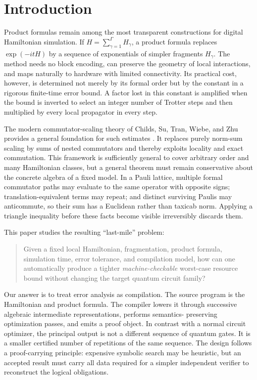 \section{Introduction}
\label{sec:introduction}

Product formulas remain among the most transparent constructions for digital
Hamiltonian simulation.  If $H=\sum_{\gamma=1}^{\Gamma}H_\gamma$, a product
formula replaces $\exp(-itH)$ by a sequence of exponentials of simpler
fragments $H_\gamma$.  The method needs no block encoding, can preserve the
geometry of local interactions, and maps naturally to hardware with limited
connectivity.  Its practical cost, however, is determined not merely by its
formal order but by the constant in a rigorous finite-time error bound.  A
factor lost in this constant is amplified when the bound is inverted to select
an integer number of Trotter steps and then multiplied by every local
propagator in every step.

The modern commutator-scaling theory of Childs, Su, Tran, Wiebe, and Zhu
provides a general foundation for such estimates
\cite{childs2021trotter}.  It replaces purely norm-sum scaling by sums of
nested commutators and thereby exploits locality and exact commutation.  This
framework is sufficiently general to cover arbitrary order and many
Hamiltonian classes, but a general theorem must remain conservative about the
concrete algebra of a fixed model.  In a Pauli lattice, multiple formal
commutator paths may evaluate to the same operator with opposite signs;
translation-equivalent terms may repeat; and distinct surviving Paulis may
anticommute, so their sum has a Euclidean rather than taxicab norm.  Applying a
triangle inequality before these facts become visible irreversibly discards
them.

This paper studies the resulting ``last-mile'' problem:

\begin{quote}
Given a fixed local Hamiltonian, fragmentation, product formula, simulation
time, error tolerance, and compilation model, how can one automatically
produce a tighter \emph{machine-checkable} worst-case resource bound without
changing the target quantum circuit family?
\end{quote}

Our answer is to treat error analysis as compilation.  The source program is
the Hamiltonian and product formula.  The compiler lowers it through
successive algebraic intermediate representations, performs semantics-
preserving optimization passes, and emits a proof object.  In contrast with a
normal circuit optimizer, the principal output is not a different sequence of
quantum gates.  It is a smaller certified number of repetitions of the same
sequence.  The design follows a proof-carrying principle: expensive symbolic
search may be heuristic, but an accepted result must carry all data required
for a simpler independent verifier to reconstruct the logical obligations.

